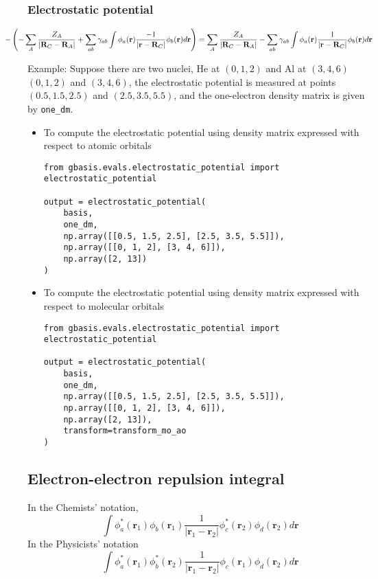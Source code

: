 \documentclass[letterpaper]{article}
\begin{document}
\subsubsection{Electrostatic potential}
\begin{equation}
  \label{eq:nuclear_electron_attraction}
  \hspace{-3em}
  - \left(
    - \sum_A \frac{Z_A}{|\mathbf{R}_C - \mathbf{R}_A|}
    + \sum_{ab} \gamma_{ab} \int \phi_a(\mathbf{r}) \frac{-1}{|\mathbf{r} - \mathbf{R}_C|} \phi_b(\mathbf{r}) d\mathbf{r}
  \right)
  =
  \sum_A \frac{Z_A}{|\mathbf{R}_C - \mathbf{R}_A|}
  - \sum_{ab} \gamma_{ab} \int \phi_a(\mathbf{r}) \frac{1}{|\mathbf{r} - \mathbf{R}_C|} \phi_b(\mathbf{r}) d\mathbf{r}
\end{equation}

Example:
Suppose there are two nuclei, He at $(0, 1, 2)$ and Al at $(3, 4, 6)$
$(0, 1, 2)$ and $(3, 4, 6)$, the electrostatic potential is measured at
points $(0.5, 1.5, 2.5)$ and $(2.5, 3.5, 5.5)$, and the one-electron density
matrix is given by \verb|one_dm|.
\begin{itemize}
\item To compute the electrostatic potential using density matrix expressed with
  respect to atomic orbitals
  \begin{lstlisting}[xleftmargin=-25pt]
from gbasis.evals.electrostatic_potential import electrostatic_potential

output = electrostatic_potential(
    basis,
    one_dm,
    np.array([[0.5, 1.5, 2.5], [2.5, 3.5, 5.5]]),
    np.array([[0, 1, 2], [3, 4, 6]]),
    np.array([2, 13])
)
\end{lstlisting}
\item To compute the electrostatic potential using density matrix expressed with
  respect to molecular orbitals
  \begin{lstlisting}[xleftmargin=-25pt]
from gbasis.evals.electrostatic_potential import electrostatic_potential

output = electrostatic_potential(
    basis,
    one_dm,
    np.array([[0.5, 1.5, 2.5], [2.5, 3.5, 5.5]]),
    np.array([[0, 1, 2], [3, 4, 6]]),
    np.array([2, 13]),
    transform=transform_mo_ao
)
\end{lstlisting}
\end{itemize}
\subsection{Electron-electron repulsion integral}
In the Chemists' notation,
\begin{equation}
  \label{eq:elec_repulsion}
  \int \phi^*_a(\mathbf{r}_1) \phi_b(\mathbf{r}_1)
  \frac{1}{|\mathbf{r}_1 - \mathbf{r}_2|}
  \phi^*_c(\mathbf{r}_2) \phi_d(\mathbf{r}_2) d\mathbf{r}
\end{equation}
In the Physicists' notation
\begin{equation}
  \label{eq:elec_repulsion_phys}
  \int \phi^*_a(\mathbf{r}_1) \phi^*_b(\mathbf{r}_2)
  \frac{1}{|\mathbf{r}_1 - \mathbf{r}_2|}
  \phi_c(\mathbf{r}_1) \phi_d(\mathbf{r}_2) d\mathbf{r}
\end{equation}
\end{document}
